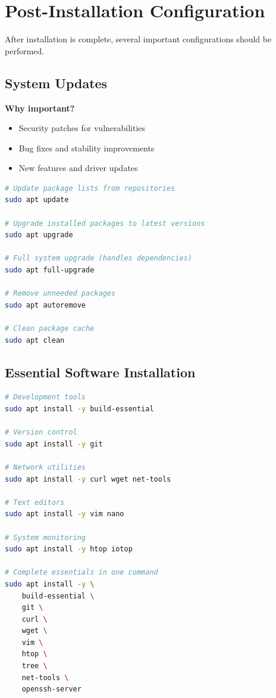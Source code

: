 
\section{Post-Installation Configuration}
\label{sec:post-installation}

After installation is complete, several important configurations should be performed.

\subsection{System Updates}

\textbf{Why important?}
\begin{itemize}
    \item Security patches for vulnerabilities
    \item Bug fixes and stability improvements
    \item New features and driver updates
\end{itemize}

\begin{lstlisting}[language=bash, caption={Update Ubuntu/Debian system}]
# Update package lists from repositories
sudo apt update

# Upgrade installed packages to latest versions
sudo apt upgrade

# Full system upgrade (handles dependencies)
sudo apt full-upgrade

# Remove unneeded packages
sudo apt autoremove

# Clean package cache
sudo apt clean
\end{lstlisting}

\subsection{Essential Software Installation}

\begin{lstlisting}[language=bash, caption={Install essential development tools}]
# Development tools
sudo apt install -y build-essential

# Version control
sudo apt install -y git

# Network utilities
sudo apt install -y curl wget net-tools

# Text editors
sudo apt install -y vim nano

# System monitoring
sudo apt install -y htop iotop

# Complete essentials in one command
sudo apt install -y \
    build-essential \
    git \
    curl \
    wget \
    vim \
    htop \
    tree \
    net-tools \
    openssh-server
\end{lstlisting}

